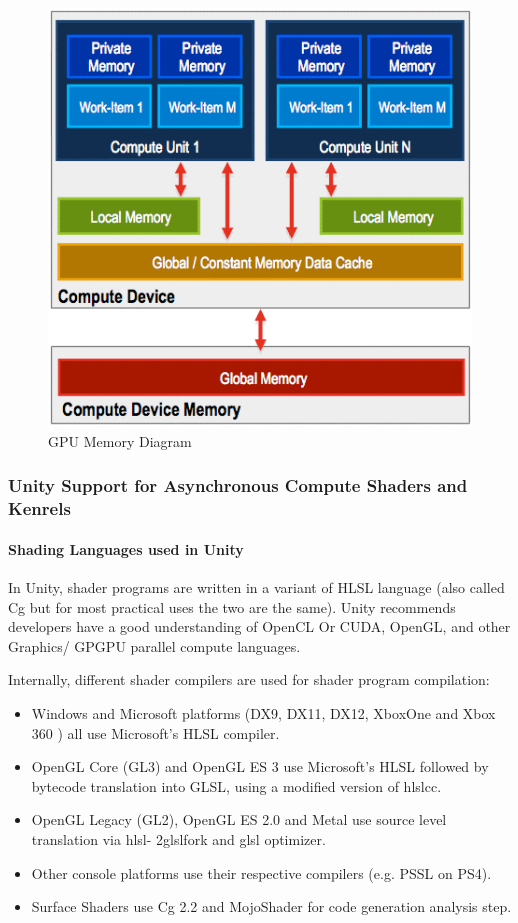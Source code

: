 \documentclass[a4paper,10pt]{article}
\begin{document}
	\begin{figure}[H]
	\centerline{ \includegraphics[scale=0.5]{gpuMem.png}}
	\caption{GPU Memory Diagram}
	\label{fig:gpuMem}
	\end{figure}
\pagebreak



\subsubsection{Unity Support for Asynchronous Compute Shaders and Kenrels}
\paragraph{Shading Languages used in Unity} 
In Unity, shader programs are written in a variant of HLSL language (also called Cg but for most practical uses the two are the same). Unity recommends developers have a good understanding 
of OpenCL Or CUDA, OpenGL, and other Graphics/ GPGPU parallel compute languages.  

Internally, different shader compilers are used for shader program compilation:\cite{unityShaders}
\begin{itemize}
  \item Windows and Microsoft platforms (DX9, DX11, DX12, XboxOne and Xbox 360 ) all use Microsoft's HLSL compiler.
  \item OpenGL Core (GL3) and OpenGL ES 3 use Microsoft’s HLSL followed by bytecode translation into GLSL, using a modified version of hlslcc.
  \item OpenGL Legacy (GL2), OpenGL ES 2.0 and Metal use source level 
  translation via
  hlsl- 2glslfork and glsl optimizer. 
  \item Other console platforms use their respective compilers (e.g. PSSL on PS4).
  \item Surface Shaders use Cg 2.2 and MojoShader for code generation analysis step.
\end{itemize} %
\end{document}
